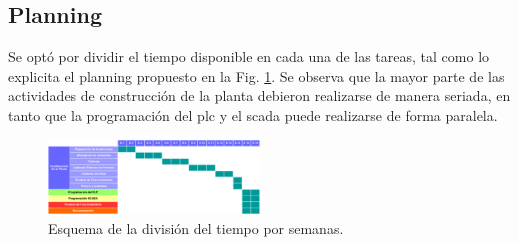 \subsection{Planning}
Se optó por dividir el tiempo disponible en cada una de las tareas, tal como lo
explicita el planning propuesto en la Fig. \ref{fig:EDT}.
Se observa que la mayor parte de las actividades de construcción de la planta
debieron realizarse de manera seriada, en tanto que la programación del
\gls{plc} y el \gls{scada} puede realizarse de forma paralela.
\begin{figure}[ht!]
	\centering
	\includegraphics[angle=90,
		width=0.501\textwidth]{Cap1-Introduccion/images/EDT.pdf}
	\caption{Esquema de la división del tiempo por semanas.}
	\label{fig:EDT}
\end{figure}

